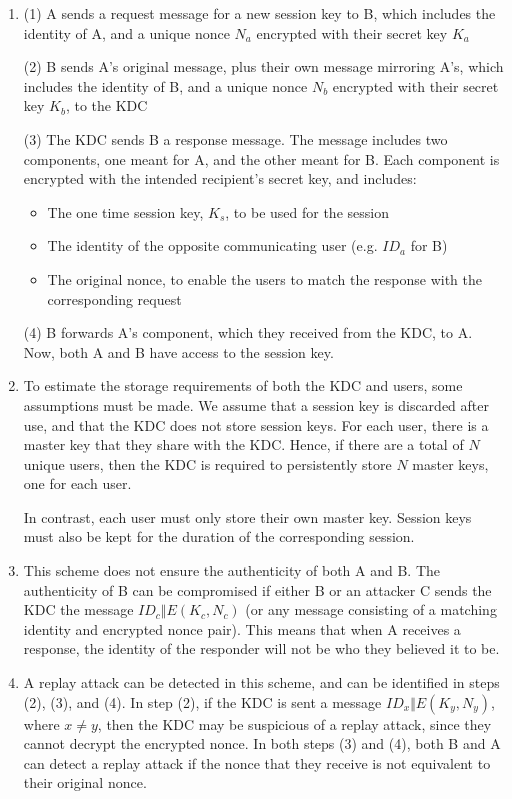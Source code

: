 \documentclass[12pt]{article}
\begin{document}
\begin{enumerate}
\item (1) A sends a request message for a new session key to B, which includes the identity of A, and a unique nonce $N_{a}$
encrypted with their secret key $K_{a}$

(2) B sends A's original message, plus their own message mirroring A's, which includes the identity of B,
and a unique nonce $N_{b}$ encrypted with their secret key $K_{b}$, to the KDC

(3) The KDC sends B a response message. The message includes two components, one meant for A, and the other meant for B.
Each component is encrypted with the intended recipient's secret key, and includes:
\begin{itemize}
	\item The one time session key, $K_{s}$, to be used for the session
	\item The identity of the opposite communicating user (e.g. $ID_{a}$ for B)
	\item The original nonce, to enable the users to match the response with the corresponding request
\end{itemize}

(4) B forwards A's component, which they received from the KDC, to A. Now, both A and B have access to the session key.


\item To estimate the storage requirements of both the KDC and users, some assumptions must be made.
We assume that a session key is discarded after use, and that the KDC does not store session keys. For each
user, there is a master key that they share with the KDC. Hence, if there are a total of $N$ unique users, then
the KDC is required to persistently store $N$ master keys, one for each user.

In contrast, each user must only store their own master key. Session keys must also be kept for the
duration of the corresponding session.

\item This scheme does not ensure the authenticity of both A and B. The authenticity of B can be compromised if
either B or an attacker C sends the KDC the message $ID_{c} \Vert E(K_{c}, N_{c})$ (or any message consisting of a
matching identity and encrypted nonce pair). This means that when A receives a response, the identity of the 
responder will not be who they believed it to be.

\item A replay attack can be detected in this scheme, and can be identified in steps (2), (3), and (4). In step (2), if the KDC
is sent a message $ID_{x} \Vert E(K_{y}, N_{y})$, where $x \neq y$, then the KDC may be suspicious of a replay
attack, since they cannot decrypt the encrypted nonce. In both steps (3) and (4), both B and A can detect a replay
attack if the nonce that they receive is not equivalent to their original nonce.

\end{enumerate}
\end{document}
